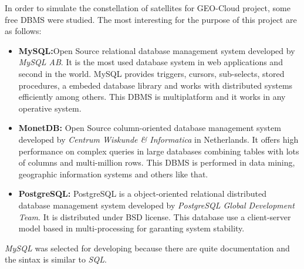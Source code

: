 In order to simulate the constellation of satellites for GEO-Cloud project, some
free \ac{DBMS} were studied. The most interesting for the purpose of this project are
as follows:
\begin{itemize}
\item \textbf{MySQL:}Open Source relational database management system developed by
  \emph{MySQL AB}. It is the most used database system in web applications and
  second in the world. MySQL provides triggers, cursors, sub-selects, stored
  procedures, a embeded database library and works with distributed systems
  efficiently among others. This \ac{DBMS} is multiplatform and it works in any
  operative system. 
\item \textbf{MonetDB:} Open Source column-oriented database management system
  developed by \emph{Centrum Wiskunde \& Informatica} in Netherlands. It offers
  high performance on complex queries in large databases combining tables with
  lots of columns and multi-million rows. This \ac{DBMS} is performed in data
  mining, geographic information systems and others like that.
\item \textbf{PostgreSQL:} PostgreSQL is a object-oriented relational
  distributed database management system developed by \emph{PostgreSQL Global
    Development Team}. It is distributed under BSD license. This database use a
  client-server model based in multi-processing for garanting system stability.
\end{itemize} 

\emph{MySQL} was selected for developing because there are quite documentation and the
sintax is similar to \emph{SQL}.

